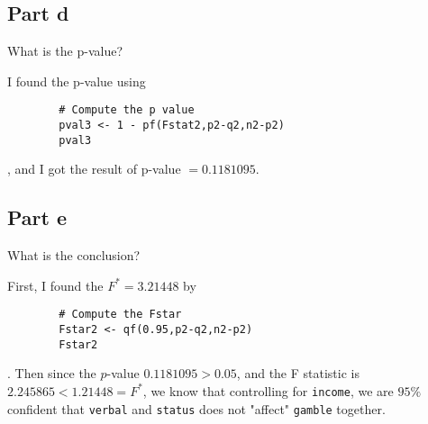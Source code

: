 \subsection{Part d}

\begin{question}
    What is the p-value?
\end{question}

\begin{answer}
    I found the p-value using 
    \begin{verbatim}
        # Compute the p value
        pval3 <- 1 - pf(Fstat2,p2-q2,n2-p2)
        pval3
    \end{verbatim}
    , and I got the result of p-value $= 0.1181095$.
\end{answer}

\subsection{Part e}

\begin{question}
    What is the conclusion?
\end{question}

\begin{answer}
    First, I found the $F^{*} = 3.21448$ by 
    \begin{verbatim}
        # Compute the Fstar
        Fstar2 <- qf(0.95,p2-q2,n2-p2)
        Fstar2
    \end{verbatim}
    . Then since the $p$-value $0.1181095 > 0.05$, and the F statistic is $2.245865 < 1.21448 = F^{*}$, we know that controlling for \verb+income+, we are $95\%$ confident that \verb+verbal+ and \verb+status+ does not "affect" \verb+gamble+ together.
\end{answer}